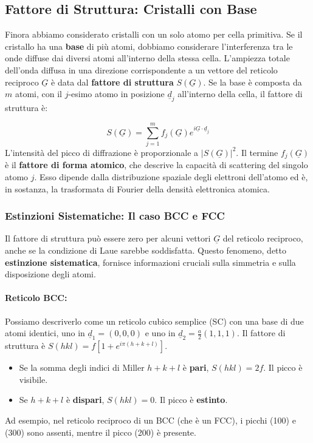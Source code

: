 \subsection{Fattore di Struttura: Cristalli con Base}
Finora abbiamo considerato cristalli con un solo atomo per cella primitiva. Se il cristallo ha una \textbf{base} di più atomi, dobbiamo considerare l'interferenza tra le onde diffuse dai diversi atomi all'interno della stessa cella. L'ampiezza totale dell'onda diffusa in una direzione corrispondente a un vettore del reticolo reciproco $\underline{G}$ è data dal \textbf{fattore di struttura} $S(\underline{G})$.
Se la base è composta da $m$ atomi, con il $j$-esimo atomo in posizione $\underline{d}_j$ all'interno della cella, il fattore di struttura è:

\begin{equation}
    S(\underline{G}) = \sum_{j=1}^{m} f_j(\underline{G}) e^{i\underline{G}\cdot\underline{d}_j}
\end{equation}
L'intensità del picco di diffrazione è proporzionale a $|S(\underline{G})|^2$. Il termine $f_j(\underline{G})$ è il \textbf{fattore di forma atomico}, che descrive la capacità di scattering del singolo atomo $j$. Esso dipende dalla distribuzione spaziale degli elettroni dell'atomo ed è, in sostanza, la trasformata di Fourier della densità elettronica atomica.

\subsubsection*{Estinzioni Sistematiche: Il caso BCC e FCC}
Il fattore di struttura può essere zero per alcuni vettori $\underline{G}$ del reticolo reciproco, anche se la condizione di Laue sarebbe soddisfatta. Questo fenomeno, detto \textbf{estinzione sistematica}, fornisce informazioni cruciali sulla simmetria e sulla disposizione degli atomi.

\paragraph{Reticolo BCC:} Possiamo descriverlo come un reticolo cubico semplice (SC) con una base di due atomi identici, uno in $\underline{d}_1 = (0,0,0)$ e uno in $\underline{d}_2 = \frac{a}{2}(1,1,1)$. Il fattore di struttura è $S(hkl) = f[1 + e^{i\pi(h+k+l)}]$.
\begin{itemize}
    \item Se la somma degli indici di Miller $h+k+l$ è \textbf{pari}, $S(hkl) = 2f$. Il picco è visibile.
    \item Se $h+k+l$ è \textbf{dispari}, $S(hkl) = 0$. Il picco è \textbf{estinto}.
\end{itemize}
Ad esempio, nel reticolo reciproco di un BCC (che è un FCC), i picchi (100) e (300) sono assenti, mentre il picco (200) è presente.

